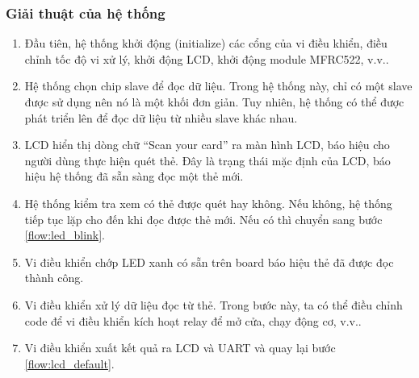 \subsubsection{Giải thuật của hệ thống}\label{ref:algorithm}
\begin{enumerate}[label={Bước \theenumi.}, leftmargin=*, ref={\theenumi}]
    \item Đầu tiên, hệ thống khởi động (initialize) các cổng của vi điều khiển, điều chỉnh tốc độ vi xử lý,
        khởi động LCD, khởi động module MFRC522, v.v..
    \item Hệ thống chọn chip slave để đọc dữ liệu.
        Trong hệ thống này, chỉ có một slave được sử dụng nên nó là một khối đơn giản.
        Tuy nhiên, hệ thống có thể được phát triển lên để đọc dữ liệu từ nhiều slave khác nhau.
    \item LCD hiển thị dòng chữ ``Scan your card'' ra màn hình LCD, báo hiệu cho người dùng thực hiện quét thẻ.
        Đây là trạng thái mặc định của LCD, báo hiệu hệ thống đã sẵn sàng đọc một thẻ mới.\label{flow:lcd_default}
    \item Hệ thống kiểm tra xem có thẻ được quét hay không. Nếu không, hệ thống tiếp tục lặp cho đến khi đọc được thẻ mới.
        Nếu có thì chuyển sang bước \ref{flow:led_blink}.
    \item Vi điều khiển chớp LED xanh có sẵn trên board báo hiệu thẻ đã được đọc thành công.\label{flow:led_blink}
    \item Vi điều khiển xử lý dữ liệu đọc từ thẻ.
        Trong bước này, ta có thể điều chỉnh code để vi điều khiển kích hoạt relay để mở cửa, chạy động cơ, v.v..
    \item Vi điều khiển xuất kết quả ra LCD và UART và quay lại bước \ref{flow:lcd_default}.
\end{enumerate}

